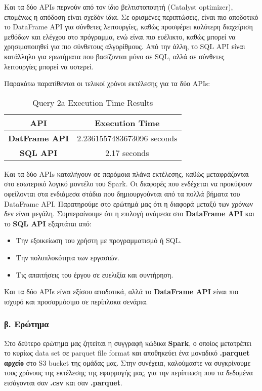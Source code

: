 \documentclass{article}
\begin{document}
Και τα δύο APIs περνούν από τον ίδιο βελτιστοποιητή (Catalyst optimizer), επομένως η απόδοση είναι σχεδόν ίδια.
Σε ορισμένες περιπτώσεις, είναι πιο αποδοτικό το DataFrame API για σύνθετες λειτουργίες, καθώς προσφέρει καλύτερη διαχείριση μεθόδων και ελέγχου στο πρόγραμμα, ενώ είναι πιο ευέλικτο, καθώς μπορεί να
χρησιμοποιηθεί για πιο σύνθετους αλγορίθμους. Από την άλλη, το SQL API είναι κατάλληλο για ερωτήματα που βασίζονται μόνο σε SQL, αλλά σε σύνθετες λειτουργίες μπορεί να υστερεί.

Παρακάτω παρατίθενται οι τελικοί χρόνοι εκτέλεσης για τα δύο APIs: \\

\begin{table}[H]
\centering
\caption{Query 2a Execution Time Results}
\label{tab:query2a_execution_times}
\begin{tabular}{|c|c|}
\hline
\textbf{API}			& 		\textbf{Execution Time}			\\ \hline
\textbf{DatFrame API}	&		2.2361557483673096 seconds		\\ \hline
\textbf{SQL API}		&		2.17 seconds						\\ \hline
\end{tabular}
\end{table}

Και τα δύο APIs καταλήγουν σε παρόμοια πλάνα εκτέλεσης, καθώς μεταφράζονται
στο εσωτερικό λογικό μοντέλο του Spark. Οι διαφορές που ενδέχεται να προκύψουν
οφείλονται στα ενδιάμεσα στάδια που δημιουργούνται από τα πολλά βήματα του
DataFrame API. Παρατηρούμε στο ερώτημά μας ότι η διαφορά μεταξύ των χρόνων
δεν είναι μεγάλη.
Συμπεραίνουμε ότι η επιλογή ανάμεσα στο \textbf{DataFrame API} και το \textbf{SQL API} εξαρτάται από:
\begin{itemize}
    \item Την εξοικείωση του χρήστη με προγραμματισμό ή SQL.
    \item Την πολυπλοκότητα των εργασιών.
    \item Τις απαιτήσεις του έργου σε ευελιξία και συντήρηση.
\end{itemize}

Και τα δύο APIs είναι εξίσου αποδοτικά, αλλά το \textbf{DataFrame API} είναι πιο ισχυρό και προσαρμόσιμο σε περίπλοκα σενάρια.


\subsubsection*{\large  β. Ερώτημα}
Στο δεύτερο ερώτημα μας ζητείται η συγγραφή κώδικα \textbf{Spark}, ο οποίος μετατρέπει το κυρίως data set σε parquet file format και αποθηκεύει ένα μοναδικό \textbf{.parquet αρχείο} στο S3 bucket της ομάδας μας. Στην συνέχεια, καλούμαστε να συγκρίνουμε τους χρόνους της εκτέλεσης της εφαρμογής μας, για την περίπτωση που τα δεδομένα εισάγονται σαν \textbf{.csv} και σαν \textbf{.parquet}.  \\
\end{document}
